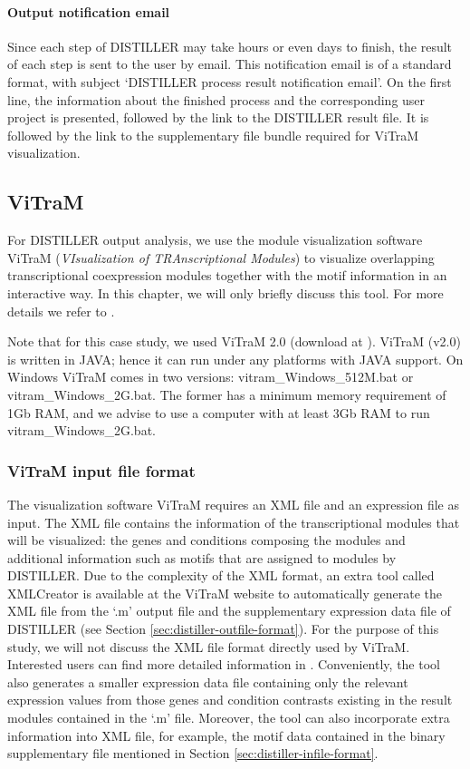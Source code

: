 \paragraph{Output notification email}\label{sec:distiller-email}

Since each step of DISTILLER may take hours or even days to finish, the result 
of each step is sent to the user by email. This notification email is of a 
standard format, with subject `DISTILLER process result notification email'. On 
the first line, the information about the finished process and the 
corresponding user project is presented, followed by the link to the DISTILLER 
result file. It is followed by the link to the supplementary file bundle 
required for ViTraM visualization.


\subsection{ViTraM}\label{sec:dist-vitram}
For DISTILLER output analysis, we use the module visualization software ViTraM 
(\textit{VIsualization of TRAnscriptional Modules}) to visualize overlapping 
transcriptional coexpression modules together with the motif information in an 
interactive way. In this chapter, we will only briefly discuss this tool. For 
more details we refer to \cite{Sun2009}. 

Note that for this case study, we used ViTraM 2.0 (download at \cite{ViTraM}). 
ViTraM (v2.0) is written in JAVA; hence it can run under any platforms with 
JAVA support. 
On Windows ViTraM comes in two versions: vitram\_Windows\_512M.bat or 
vitram\_Windows\_2G.bat. The former has a minimum memory requirement of 1Gb 
RAM, and we advise to use a computer with at least 3Gb RAM to run 
vitram\_Windows\_2G.bat. %


\subsubsection{ViTraM input file format}
The visualization software ViTraM requires an XML file and an expression file 
as input. The XML file contains the information of the transcriptional modules 
that will be visualized: the genes and conditions composing the modules and 
additional information such as motifs that are assigned to modules by 
DISTILLER. Due to the complexity of the XML format, an extra tool called 
XMLCreator is available at the ViTraM website to automatically generate the XML 
file from the `.m' output file and the supplementary expression data file of 
DISTILLER (see Section \ref{sec:distiller-outfile-format}). 
For the purpose of this study, we will not discuss the XML file format directly 
used by ViTraM. 
Interested users can find more detailed information in \cite{Sun2009}. 
Conveniently, the tool also generates a smaller expression data file containing 
only the relevant expression values from those genes and condition contrasts 
existing in the result modules contained in the `.m' file. Moreover, the tool 
can also incorporate extra information into XML file, for example, the motif 
data contained in the binary supplementary file mentioned in Section 
\ref{sec:distiller-infile-format}. 


